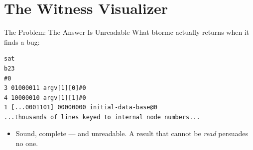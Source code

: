\documentclass[aspectratio=169]{beamer}
\begin{document}
\part{The Witness Visualizer}
\begin{frame}
  \partpage
\end{frame}

\begin{frame}[fragile]{The Problem: The Answer Is Unreadable}
  What btormc actually returns when it finds a bug:
  \begin{example}{}
\begin{verbatim}
sat
b23
#0
3 01000011 argv[1][0]#0
4 10000010 argv[1][1]#0
1 [...0001101] 00000000 initial-data-base@0
...thousands of lines keyed to internal node numbers...
\end{verbatim}
  \end{example}
  \vspace{0.15cm}
  \begin{itemize}\setlength\itemsep{0.3em}
    \item Sound, complete --- and unreadable. A result that cannot be
          \emph{read} persuades no one.
  \end{itemize}
\end{frame}
\end{document}
